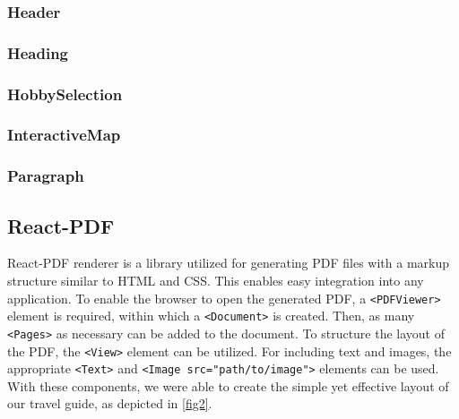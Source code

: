 \documentclass[english,notitlepage,smartquotes]{hgbreport}
\begin{document}
\subsubsection{Header}

\subsubsection{Heading}

\subsubsection{HobbySelection} \label{HobbySelectionComponent}

\subsubsection{InteractiveMap} \label{InteractiveMap}

\subsubsection{Paragraph}

\subsection{React-PDF} \label{ReactPDF}

React-PDF renderer is a library utilized for generating PDF files with a markup structure similar to HTML and CSS. This enables easy integration into any application. To enable the browser to open the generated PDF, a \texttt{<PDFViewer>} element is required, within which a \texttt{<Document>} is created. Then, as many \texttt{<Pages>} as necessary can be added to the document. To structure the layout of the PDF, the \texttt{<View>} element can be utilized. For including text and images, the appropriate \texttt{<Text>} and \texttt{<Image src="path/to/image">} elements can be used. With these components, we were able to create the simple yet effective layout of our travel guide, as depicted in \ref{fig2}.
\end{document}
